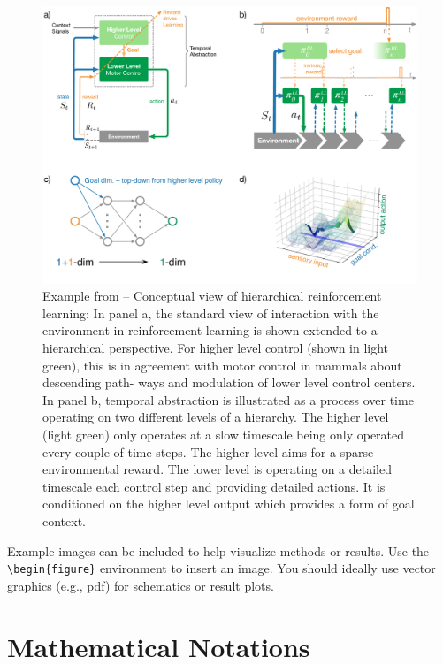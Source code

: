 \begin{figure}[tb]
\centering
\includegraphics[width=\textwidth]{img/fig4_hrl}
\caption{Example from \citep{schilling2023} -- Conceptual view of hierarchical reinforcement learning: In panel a, the standard view of interaction with the environment in reinforcement learning is shown extended to a hierarchical perspective. For higher level control (shown in light green), this is in agreement with motor control in mammals about descending path- ways and modulation of lower level control centers. In panel b, temporal abstraction is illustrated as a process over time operating on two different levels of a hierarchy. The higher level (light green) only operates at a slow timescale being only operated every couple of time steps. The higher level aims for a sparse environmental reward. The lower level is operating on a detailed timescale each control step and providing detailed actions. It is conditioned on the higher level output which provides a form of goal context.}
\label{fig:method_example}
\end{figure}



Example images can be included to help visualize methods or results. Use the \verb+\begin{figure}+ environment to insert an image. You should ideally use vector graphics (e.g., pdf) for schematics or result plots.

\section{Mathematical Notations}
\label{s:notation}

